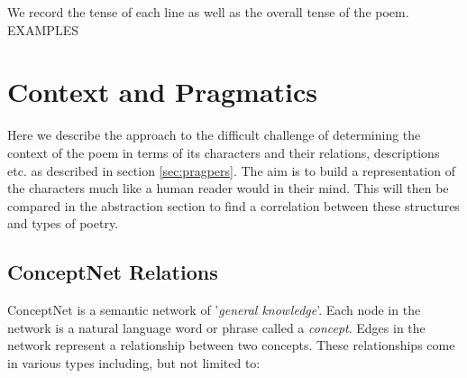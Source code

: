 We record the tense of each line as well as the overall tense of the poem. EXAMPLES

\section{Context and Pragmatics}
Here we describe the approach to the difficult challenge of determining the context of the poem in terms of its characters and their relations, descriptions etc. as described in section \ref{sec:pragpers}. The aim is to build a representation of the characters much like a human reader would in their mind. This will then be compared in the abstraction section to find a correlation between these structures and types of poetry.

\subsection{ConceptNet Relations}
ConceptNet is a semantic network of '\textit{general knowledge}'. Each node in the network is a natural language word or phrase called a \textit{concept}. Edges in the network represent a relationship between two concepts. These relationships come in various types including, but not limited to:

